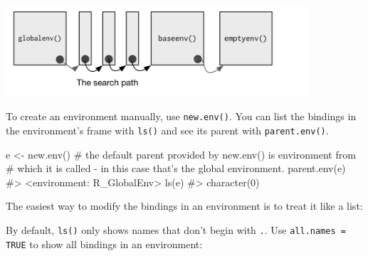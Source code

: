 \documentclass[oneside]{book}
\newenvironment{Shaded}{}{}
\newcommand{\KeywordTok} [1]{\textcolor[rgb]{0.00,0.44,0.13}{{#1}}}
\newcommand{\DataTypeTok}[1]{\textcolor[rgb]{0.56,0.13,0.00}{{#1}}}
\newcommand{\DecValTok}  [1]{\textcolor[rgb]{0.25,0.63,0.44}{{#1}}}
\newcommand{\StringTok}  [1]{\textcolor[rgb]{0.25,0.44,0.63}{{#1}}}
\newcommand{\CommentTok} [1]{\textcolor[rgb]{0.38,0.63,0.69}{{#1}}}
\newcommand{\OtherTok}   [1]{\textcolor[rgb]{0.00,0.44,0.13}{{#1}}}
\newcommand{\NormalTok}  [1]{{#1}}
\begin{document}
\includegraphics[width=4.43in,height=1.33in]{diagrams/environments.png/search-path.png}

To create an environment manually, use \texttt{new.env()}. You can list
the bindings in the environment's frame with \texttt{ls()} and see its
parent with \texttt{parent.env()}.

\begin{Shaded}
\begin{Highlighting}[]
\NormalTok{e <-}\StringTok{ }\KeywordTok{new.env}\NormalTok{()}
\CommentTok{# the default parent provided by new.env() is environment from }
\CommentTok{# which it is called - in this case that's the global environment.}
\KeywordTok{parent.env}\NormalTok{(e)}
\CommentTok{#> <environment: R_GlobalEnv>}
\KeywordTok{ls}\NormalTok{(e)}
\CommentTok{#> character(0)}
\end{Highlighting}
\end{Shaded}

The easiest way to modify the bindings in an environment is to treat it
like a list:

\begin{Shaded}
\end{Shaded}

By default, \texttt{ls()} only shows names that don't begin with
\texttt{.}. Use \texttt{all.names = TRUE} to show all bindings in an
environment:

\begin{Shaded}
\end{Shaded}
\end{document}

